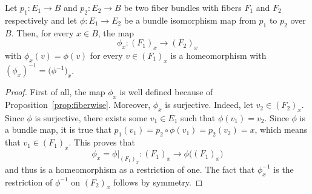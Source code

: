 \begin{proposition}
Let $p_1:E_1\to B$ and $p_2:E_2\to B$ be two fiber bundles with fibers $F_1$ and $F_2$ respectively and let $\phi:E_1\to E_2$ be a bundle isomorphism map from $p_1$ to $p_2$ over $B$. Then, for every $x\in B$, the map
\[\phi_x:{\left(F_1\right)}_x\to{\left(F_2\right)}_x\]
with $\phi_x(v)=\phi(v)$ for every $v\in\left(F_1\right)_x$ is a homeomorphism with $(\phi_x)^{-1}=\big(\phi^{-1}\big)_x$.
\end{proposition}
\begin{proof} First of all, the map $\phi_x$ is well defined because of Proposition~\ref{prop:fiberwise}. Moreover, $\phi_x$ is surjective. Indeed, let $v_2\in (F_2)_x$. Since $\phi$ is surjective, there exists some $v_1\in E_1$ such that $\phi(v_1)=v_2$. Since $\phi$ is a bundle map, it is true that $p_1(v_1)=p_2\circ\phi(v_1)=p_2(v_2)=x$, which means that $v_1\in(F_1)_x$. This proves that
\[\phi_x=\phi|_{{(F_1)}_x}:{(F_1)}_x\to\phi\big({(F_1)}_x\big)\]
and thus is a homeomorphism as a restriction of one. The fact that $\phi_x^{-1}$ is the restriction of $\phi^{-1}$ on ${(F_2)}_x$ follows by symmetry.
\end{proof}



